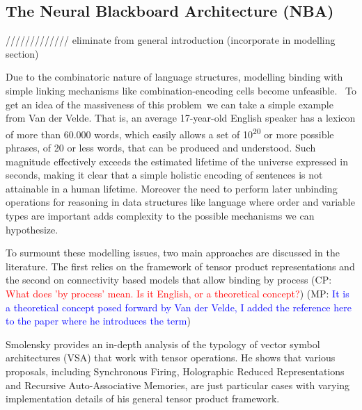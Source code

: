 \documentclass[10pt]{article}
\newcommand{\noteCP}[1]{(CP: \textcolor{red}{#1})}
\newcommand{\noteMP}[2]{(MP: \textcolor{blue}{#1})}
\begin{document}
\subsection{The Neural Blackboard Architecture (NBA)}

{\label{935508}}

///////////// eliminate from general introduction (incorporate in modelling section)

Due to the combinatoric nature of language structures, modelling binding with simple linking mechanisms like combination-encoding cells become
unfeasible\cite{von_der_Malsburg_1999}. ~To get an idea of the
massiveness of this problem~we can take a simple example from Van der
Velde\cite{van_der_Velde_2006}. That is, an average 17-year-old
English speaker has a lexicon of more than 60.000 words, which easily
allows a set of 10\textsuperscript{20} or more possible phrases, of 20
or less words, that can be produced and understood. Such magnitude
effectively exceeds the estimated lifetime of the universe expressed
in seconds, making it clear that a simple holistic encoding of
sentences is not attainable in a human lifetime. Moreover the need to perform later unbinding operations for reasoning in data structures like language where order and variable types are important adds complexity to the possible mechanisms we can hypothesize.


To surmount these modelling issues, two main approaches are discussed in the literature. The first relies on the framework of tensor product
representations\cite{smolensky2006harmonic} and the second on connectivity based models that allow
binding by process\cite{van_der_Velde_2015}
\noteCP{What does 'by process' mean. Is it English, or a theoretical concept?}
\noteMP{It is a theoretical concept posed forward by Van der Velde, I added the reference here to the paper where he introduces the term}.


Smolensky provides an in-depth analysis of the typology of vector symbol architectures (VSA)
that work with tensor operations. He shows that various proposals,
including Synchronous Firing\cite{Shastri_1993}, Holographic Reduced
Representations\cite{Plate_1995} and Recursive Auto-Associative
Memories\cite{Chalmers_1992}, are just particular cases with varying
implementation details of his general tensor product framework.
\end{document}
